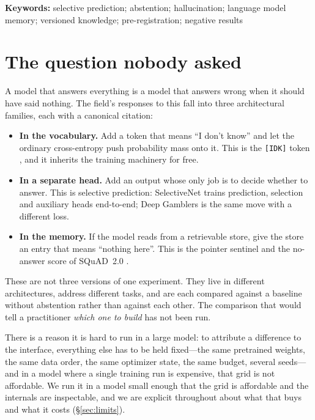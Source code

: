 \documentclass[11pt,a4paper]{article}
\begin{document}
\vspace{0.5em}
\noindent\textbf{Keywords:} selective prediction; abstention; hallucination; language model memory;
versioned knowledge; pre-registration; negative results

\section{The question nobody asked}

A model that answers everything is a model that answers wrong when it should have said nothing. The
field's responses to this fall into three architectural families, each with a canonical citation:

\begin{itemize}
\item \textbf{In the vocabulary.} Add a token that means ``I don't know'' and let the ordinary
cross-entropy push probability mass onto it. This is the \texttt{[IDK]} token
\citep{cohen2024idk}, and it inherits the training machinery for free.
\item \textbf{In a separate head.} Add an output whose only job is to decide whether to answer.
This is selective prediction: SelectiveNet \citep{geifman2019selectivenet} trains prediction,
selection and auxiliary heads end-to-end; Deep Gamblers is the same move with a different loss.
\item \textbf{In the memory.} If the model reads from a retrievable store, give the store an entry
that means ``nothing here''. This is the pointer sentinel \citep{merity2016pointer} and the
no-answer score of SQuAD~2.0 \citep{rajpurkar2018squad2}.
\end{itemize}

These are not three versions of one experiment. They live in different architectures, address
different tasks, and are each compared against a baseline without abstention rather than against
each other. The comparison that would tell a practitioner \emph{which one to build} has not been
run.

There is a reason it is hard to run in a large model: to attribute a difference to the interface,
everything else has to be held fixed---the same pretrained weights, the same data order, the same
optimizer state, the same budget, several seeds---and in a model where a single training run is
expensive, that grid is not affordable. We run it in a model small enough that the grid is
affordable and the internals are inspectable, and we are explicit throughout about what that buys
and what it costs (\S\ref{sec:limits}).
\end{document}

